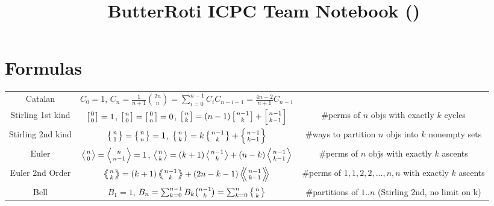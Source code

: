 \documentclass[13pt,a4paper]{article}
\title{\vspace{-4ex}\Large{ButterRoti ICPC Team Notebook (\the\year)}}
\author{}
\date{}
\begin{document}
\begin{landscape}
\begin{multicols}{2}

\maketitle
\vspace{-13ex}
\tableofcontents
\pagestyle{fancy}



\end{multicols}
\newpage
\begingroup
\fontsize{12pt}{12pt}\selectfont
\section{Formulas}
\begin{tabular}{@{}c|c|c@{}}
    \toprule
    Catalan &   $C_0=1$, $C_n=\frac{1}{n+1}\binom{2n}{n} = \sum_{i=0}^{n-1}C_iC_{n-i-1} = \frac{4n-2}{n+1}C_{n-1}$  & \\
    Stirling 1st kind & $\left[{0\atop 0}\right]=1$, $\left[{n\atop 0}\right]=\left[{0\atop n}\right]=0$, $\left[{n\atop k}\right]=(n-1)\left[{n-1\atop k}\right]+\left[{n-1\atop k-1}\right]$ & \#perms of $n$ objs with exactly $k$ cycles\\
    Stirling 2nd kind & $\left\{{n\atop 1}\right\}=\left\{{n\atop n}\right\}=1$, $\left\{{n\atop k}\right\} = k \left\{{ n-1 \atop k }\right\} + \left\{{n-1\atop k-1}\right\}$ & \#ways to partition $n$ objs into $k$ nonempty sets\\
    Euler   & $\left \langle {n\atop 0} \right \rangle = \left \langle {n\atop n-1} \right \rangle = 1 $, $\left \langle {n\atop k} \right \rangle = (k+1) \left \langle {n-1\atop {k}} \right \rangle + (n-k)\left \langle {{n-1}\atop {k-1}} \right \rangle$ & \#perms of $n$ objs with exactly $k$ ascents \\
    Euler 2nd Order &  $\left \langle \!\!\left \langle {n\atop k} \right \rangle \!\! \right \rangle = (k+1) \left \langle \!\! \left \langle {{n-1}\atop {k}} \right \rangle \!\! \right \rangle +(2n-k-1)\left \langle \!\! \left \langle {{n-1}\atop {k-1}} \right \rangle  \!\! \right \rangle$ & \#perms of ${1,1,2,2,...,n,n}$ with exactly $k$ ascents \\
    Bell & $B_1 = 1$, $B_n = \sum_{k=0}^{n-1} B_k \binom{n-1}{k} = \sum_{k=0}^n\left\{{n\atop k}\right\}$ & \#partitions of $1..n$ (Stirling 2nd, no limit on k)\\
    \bottomrule
\end{tabular}


\end{landscape}
\end{document}

